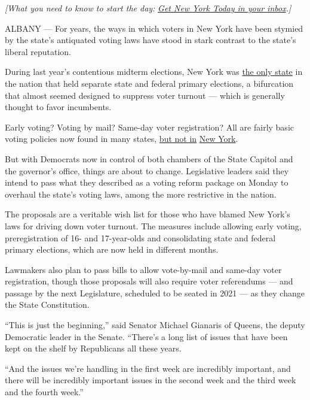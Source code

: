 \emph{{[}What you need to know to start the day:}
\href{https://www.nytimes.com/newsletters/newyorktoday?module=inline}{\emph{Get
New York Today in your inbox}}\emph{.{]}}

ALBANY --- For years, the ways in which voters in New York have been
stymied by the state's antiquated voting laws have stood in stark
contrast to the state's liberal reputation.

During last year's contentious midterm elections, New York was
\href{https://www.nytimes.com/2018/06/25/nyregion/new-york-primary-congress-state-federal.html}{the
only state} in the nation that held separate state and federal primary
elections, a bifurcation that almost seemed designed to suppress voter
turnout --- which is generally thought to favor incumbents.

Early voting? Voting by mail? Same-day voter registration? All are
fairly basic voting policies now found in many states,
\href{https://www.nytimes.com/2018/12/19/nyregion/early-voting-reform-laws-ny.html}{but
not in}
\href{https://www.nytimes.com/2018/12/19/nyregion/early-voting-reform-laws-ny.html}{New
York}.

But with Democrats now in control of both chambers of the State Capitol
and the governor's office, things are about to change. Legislative
leaders said they intend to pass what they described as a voting reform
package on Monday to overhaul the state's voting laws, among the more
restrictive in the nation.

The proposals are a veritable wish list for those who have blamed New
York's laws for driving down voter turnout. The measures include
allowing early voting, preregistration of 16- and 17-year-olds and
consolidating state and federal primary elections, which are now held in
different months.

Lawmakers also plan to pass bills to allow vote-by-mail and same-day
voter registration, though those proposals will also require voter
referendums --- and passage by the next Legislature, scheduled to be
seated in 2021 --- as they change the State Constitution.

``This is just the beginning,'' said Senator Michael Gianaris of Queens,
the deputy Democratic leader in the Senate. ``There's a long list of
issues that have been kept on the shelf by Republicans all these years.

``And the issues we're handling in the first week are incredibly
important, and there will be incredibly important issues in the second
week and the third week and the fourth week.''

